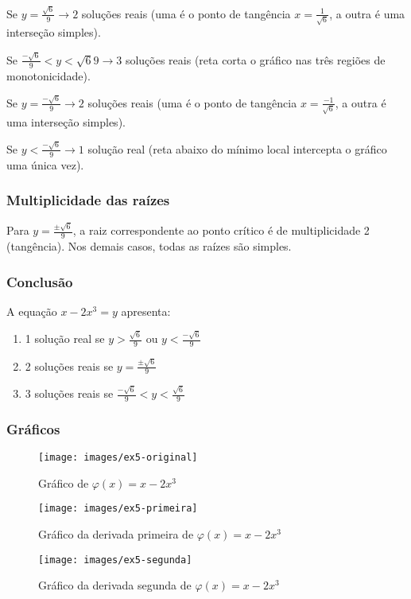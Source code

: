 \documentclass[../resumo.tex]{subfiles}
\begin{document}
	Se $y = \frac{\sqrt{6}}{9} \rightarrow 2$ soluções reais
	(uma é o ponto de tangência $x = \frac{1}{\sqrt{6}}$, a outra é uma interseção simples).

	Se $\frac{-\sqrt{6}}{9} < y < \sqrt{6}{9} \rightarrow 3$ soluções reais
	(reta corta o gráfico nas três regiões de monotonicidade).

	Se $y = \frac{-\sqrt{6}}{9} \rightarrow 2$ soluções reais
	(uma é o ponto de tangência $x = \frac{-1}{\sqrt{6}}$, a outra é uma interseção simples).

	Se $y < \frac{-\sqrt{6}}{9} \rightarrow 1$ solução real
	(reta abaixo do mínimo local intercepta o gráfico uma única vez).

	\subsubsection{Multiplicidade das raízes}

	Para $y = \frac{\pm \sqrt{6}}{9}$, a raiz correspondente ao ponto crítico é de multiplicidade 2 (tangência).
	Nos demais casos, todas as raízes são simples.

	\subsubsection{Conclusão}

	A equação $x - 2x^3 = y$ apresenta:
	\begin{enumerate}
		\item 1 solução real se $y > \frac{\sqrt{6}}{9}$ ou $y < \frac{-\sqrt{6}}{9}$
		\item 2 soluções reais se $y = \frac{\pm \sqrt{6}}{9}$
		\item 3 soluções reais se $\frac{-\sqrt{6}}{9} < y < \frac{\sqrt{6}}{9}$
	\end{enumerate}

	\subsubsection{Gráficos}

	\begin{figure}[H]
			\centering
			\texttt{[image: images/ex5-original]}
			\caption{Gráfico de $\varphi(x) = x - 2x^3$}
	\end{figure}

	\begin{figure}[H]
			\centering
			\texttt{[image: images/ex5-primeira]}
			\caption{Gráfico da derivada primeira de $\varphi(x) = x - 2x^3$}
	\end{figure}

	\begin{figure}[H]
			\centering
			\texttt{[image: images/ex5-segunda]}
			\caption{Gráfico da derivada segunda de $\varphi(x) = x - 2x^3$}
	\end{figure}
\end{document}

